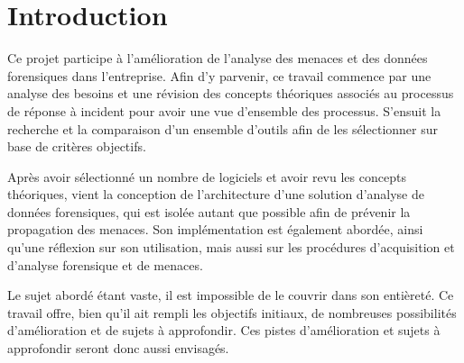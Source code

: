 
\chapter{Introduction}

Ce projet participe à l'amélioration de l'analyse des menaces et des données forensiques dans l'entreprise. Afin d'y parvenir, ce travail commence par une analyse des besoins et une révision des concepts théoriques associés au processus de réponse à incident pour avoir une vue d'ensemble des processus. S'ensuit la recherche et la comparaison d'un ensemble d'outils afin de les sélectionner sur base de critères objectifs.

Après avoir sélectionné un nombre de logiciels et avoir revu les concepts théoriques, vient la conception de l'architecture d'une solution d'analyse de données forensiques, qui est isolée autant que possible afin de prévenir la propagation des menaces. Son implémentation est également abordée, ainsi qu'une réflexion sur son utilisation, mais aussi sur les procédures d'acquisition et d'analyse forensique et de menaces.

Le sujet abordé étant vaste, il est impossible de le couvrir dans son entièreté. Ce travail offre, bien qu'il ait rempli les objectifs initiaux, de nombreuses possibilités d'amélioration et de sujets à approfondir. Ces pistes d'amélioration et sujets à approfondir seront donc aussi envisagés.

